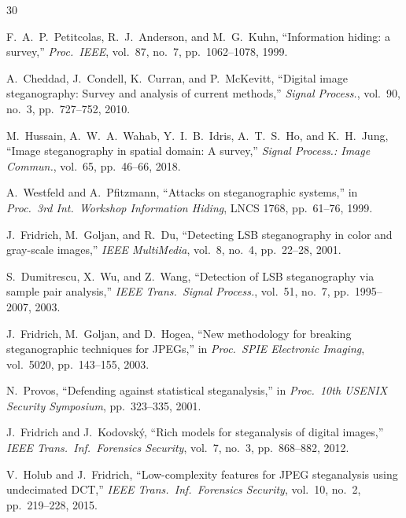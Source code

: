\documentclass[10pt,twocolumn,a4paper]{article}
\begin{document}
\clearpage
\renewcommand{\refname}{References}

\begin{thebibliography}{30}\small

F.~A.~P.~Petitcolas, R.~J.~Anderson, and M.~G.~Kuhn,
``Information hiding: a survey,''
\textit{Proc.\ IEEE}, vol.~87, no.~7, pp.~1062--1078, 1999.

A.~Cheddad, J.~Condell, K.~Curran, and P.~McKevitt,
``Digital image steganography: Survey and analysis of current methods,''
\textit{Signal Process.}, vol.~90, no.~3, pp.~727--752, 2010.

M.~Hussain, A.~W.~A.~Wahab, Y.~I.~B.~Idris, A.~T.~S.~Ho, and K.~H.~Jung,
``Image steganography in spatial domain: A survey,''
\textit{Signal Process.: Image Commun.}, vol.~65, pp.~46--66, 2018.

A.~Westfeld and A.~Pfitzmann,
``Attacks on steganographic systems,''
in \textit{Proc.\ 3rd Int.\ Workshop Information Hiding}, LNCS 1768, pp.~61--76, 1999.

J.~Fridrich, M.~Goljan, and R.~Du,
``Detecting LSB steganography in color and gray-scale images,''
\textit{IEEE MultiMedia}, vol.~8, no.~4, pp.~22--28, 2001.

S.~Dumitrescu, X.~Wu, and Z.~Wang,
``Detection of LSB steganography via sample pair analysis,''
\textit{IEEE Trans.\ Signal Process.}, vol.~51, no.~7, pp.~1995--2007, 2003.

J.~Fridrich, M.~Goljan, and D.~Hogea,
``New methodology for breaking steganographic techniques for JPEGs,''
in \textit{Proc.\ SPIE Electronic Imaging}, vol.~5020, pp.~143--155, 2003.

N.~Provos,
``Defending against statistical steganalysis,''
in \textit{Proc.\ 10th USENIX Security Symposium}, pp.~323--335, 2001.

J.~Fridrich and J.~Kodovsk\'{y},
``Rich models for steganalysis of digital images,''
\textit{IEEE Trans.\ Inf.\ Forensics Security}, vol.~7, no.~3, pp.~868--882, 2012.

V.~Holub and J.~Fridrich,
``Low-complexity features for JPEG steganalysis using undecimated DCT,''
\textit{IEEE Trans.\ Inf.\ Forensics Security}, vol.~10, no.~2, pp.~219--228, 2015.


\end{thebibliography}
\end{document}
